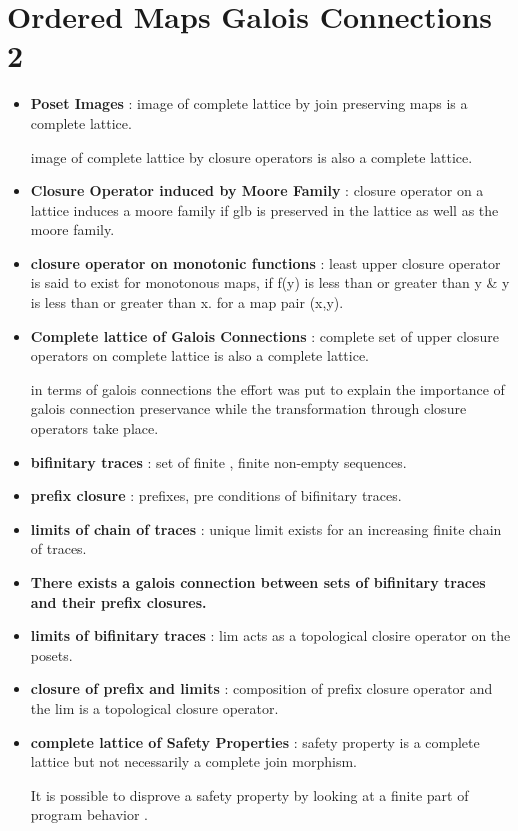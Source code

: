 \chapter{Ordered Maps Galois Connections 2}

\begin{itemize}

	\item{\textbf{Poset Images} : 
	image of complete lattice by join preserving maps is a complete lattice.

	image of complete lattice by closure operators is also a complete lattice.
	}

	\item{\textbf{Closure Operator induced by Moore Family} : closure operator on a lattice induces a moore family if glb is preserved in the lattice as well as the moore family.
	}

	\item{\textbf{closure operator on monotonic functions} : least upper closure operator is said to exist for monotonous maps, if f(y) is less than or greater than y \& y  is less than or greater than x. for a map pair (x,y).
	}

	\item{\textbf{Complete lattice of Galois Connections} : complete set of upper closure operators on complete lattice is also a complete lattice.

	in terms of galois connections the effort was put to explain the importance of galois connection preservance while the transformation through closure operators take place.
	}


	\item{\textbf{bifinitary traces} :
	set of finite , finite non-empty sequences.
	}

	\item{\textbf{prefix closure} : prefixes, pre conditions of bifinitary traces.
	}

	\item{\textbf{limits of chain of traces} : unique limit exists for an increasing finite chain of traces.
	}

	\item{\textbf{There exists a galois connection between sets of bifinitary traces and their prefix closures.}
	}

	\item{\textbf{limits of bifinitary traces} :  lim acts as a topological closire operator on the posets.
	}

	\item{\textbf{closure of prefix and limits} : composition of prefix closure operator and the lim is a topological closure operator.
	}

	\item{\textbf{complete lattice of Safety Properties} : safety property is a complete lattice but not necessarily a complete join morphism. 

	It is possible to disprove a safety property by looking at a finite part of program behavior . 
	}

\end{itemize}

